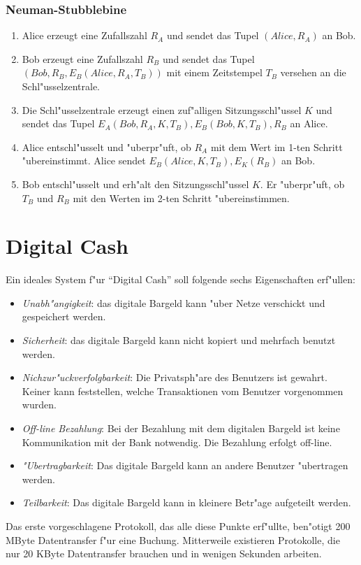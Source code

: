 
\subsubsection*{Neuman-Stubblebine}

\begin{enumerate}
  \item Alice erzeugt eine Zufallszahl $R_A$ und sendet das Tupel
        $(Alice,R_A)$ an Bob.
  \item Bob erzeugt eine Zufallszahl $R_B$ und sendet das Tupel
        $(Bob,R_B,E_B(Alice,R_A,T_B))$ mit einem Zeitstempel $T_B$
        versehen an die Schl"usselzentrale.
  \item Die Schl"usselzentrale erzeugt einen zuf"alligen
        Sitzungsschl"ussel $K$ und sendet das Tupel
        $E_A(Bob,R_A,K,T_B),E_B(Bob,K,T_B),R_B$ an Alice.
  \item Alice entschl"usselt und "uberpr"uft, ob $R_A$ mit dem Wert im
        1-ten Schritt "ubereinstimmt. Alice sendet
        $E_B(Alice,K,T_B),E_K(R_B)$ an Bob.
  \item Bob entschl"usselt und erh"alt den Sitzungsschl"ussel $K$. Er
        "uberpr"uft, ob $T_B$ und $R_B$ mit den Werten im 2-ten
        Schritt "ubereinstimmen.
\end{enumerate}


\section{Digital Cash}

Ein ideales System f"ur "`Digital Cash"' soll folgende sechs
Eigenschaften erf"ullen:
\begin{itemize}
  \item {\em Unabh"angigkeit}: das digitale Bargeld kann "uber Netze
        verschickt und gespeichert werden.
  \item {\em Sicherheit}: das digitale Bargeld kann nicht kopiert und
        mehrfach benutzt werden.
  \item {\em Nichzur"uckverfolgbarkeit}: Die Privatsph"are des
        Benutzers ist gewahrt. Keiner kann feststellen, welche
        Transaktionen vom Benutzer vorgenommen wurden.
  \item {\em Off-line Bezahlung}: Bei der Bezahlung mit dem digitalen
        Bargeld ist keine Kommunikation mit der Bank notwendig. Die
        Bezahlung erfolgt off-line.
  \item {\em "Ubertragbarkeit}: Das digitale Bargeld kann an andere
        Benutzer "ubertragen werden.
  \item {\em Teilbarkeit}: Das digitale Bargeld kann in kleinere
        Betr"age aufgeteilt werden.
\end{itemize}
Das erste vorgeschlagene Protokoll, das alle diese Punkte erf"ullte,
ben"otigt 200 MByte Datentransfer f"ur eine Buchung. Mitterweile
existieren Protokolle, die nur 20 KByte Datentransfer brauchen und in
wenigen Sekunden arbeiten.

